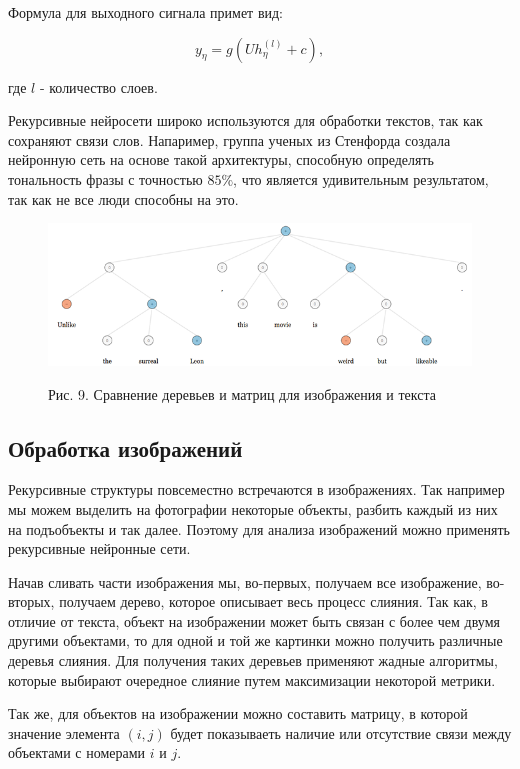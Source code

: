 \documentclass[14pt]{article}
\begin{document}
Формула для выходного сигнала примет вид:

\begin{equation}
y_\eta=g(Uh_\eta^{(l)} + c),
\end{equation}


где $l$ - количество слоев.


Рекурсивные нейросети широко используются для обработки текстов, так как сохраняют связи слов. Напаример, группа ученых из Стенфорда создала нейронную сеть на основе такой архитектуры, способную определять тональность фразы с точностью $85\%$, что является удивительным результатом, так как не все люди способны на это.

\begin{figure}[!h]
    \centering
        \includegraphics[width=16cm]{Fig8.png}
    \parbox[t][1.2cm][c]{16cm}{
        \centering
        Рис. 9. Сравнение деревьев и матриц для изображения и текста
    }
\end{figure}

\subsection{Обработка изображений}
Рекурсивные структуры повсеместно встречаются в изображениях. Так например мы можем выделить на фотографии некоторые объекты, разбить каждый из них на подъобъекты и так далее. Поэтому для анализа изображений можно применять рекурсивные нейронные сети.

Начав сливать части изображения мы, во-первых, получаем все изображение, во-вторых, получаем дерево, которое описывает весь процесс слияния. Так как, в отличие от текста, объект на изображении может быть связан с более чем двумя другими объектами, то для одной и той же картинки можно получить различные деревья слияния. Для получения таких деревьев применяют жадные алгоритмы, которые выбирают очередное слияние путем максимизации некоторой метрики.


Так же, для объектов на изображении можно составить матрицу, в которой значение элемента $(i, j)$ будет показываеть наличие или отсутствие связи между объектами с номерами $i$ и $j$.
\end{document}
